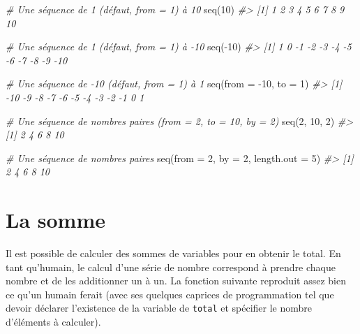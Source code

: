 \documentclass[
]{book}
\newenvironment{Shaded}{}{}
\newcommand{\AttributeTok}[1]{#1}
\newcommand{\CommentTok}[1]{\textit{#1}}
\newcommand{\DecValTok}[1]{#1}
\newcommand{\FunctionTok}[1]{#1}
\newcommand{\NormalTok}[1]{#1}
\newcommand{\SpecialCharTok}[1]{#1}
\begin{document}
\begin{Shaded}
\begin{Highlighting}[]
\CommentTok{\# Une séquence de 1 (défaut, from = 1) à 10}
\FunctionTok{seq}\NormalTok{(}\DecValTok{10}\NormalTok{)}
\CommentTok{\#\textgreater{}  [1]  1  2  3  4  5  6  7  8  9 10}

\CommentTok{\# Une séquence de 1 (défaut, from = 1) à {-}10}
\FunctionTok{seq}\NormalTok{(}\SpecialCharTok{{-}}\DecValTok{10}\NormalTok{)}
\CommentTok{\#\textgreater{}  [1]   1   0  {-}1  {-}2  {-}3  {-}4  {-}5  {-}6  {-}7  {-}8  {-}9 {-}10}

\CommentTok{\# Une séquence de {-}10 (défaut, from = 1) à 1}
\FunctionTok{seq}\NormalTok{(}\AttributeTok{from =} \SpecialCharTok{{-}}\DecValTok{10}\NormalTok{, }\AttributeTok{to =} \DecValTok{1}\NormalTok{)}
\CommentTok{\#\textgreater{}  [1] {-}10  {-}9  {-}8  {-}7  {-}6  {-}5  {-}4  {-}3  {-}2  {-}1   0   1}

\CommentTok{\# Une séquence de nombres paires (from = 2, to = 10, by = 2)}
\FunctionTok{seq}\NormalTok{(}\DecValTok{2}\NormalTok{, }\DecValTok{10}\NormalTok{, }\DecValTok{2}\NormalTok{)}
\CommentTok{\#\textgreater{} [1]  2  4  6  8 10}

\CommentTok{\# Une séquence de nombres paires }
\FunctionTok{seq}\NormalTok{(}\AttributeTok{from =} \DecValTok{2}\NormalTok{, }\AttributeTok{by =} \DecValTok{2}\NormalTok{, }\AttributeTok{length.out =} \DecValTok{5}\NormalTok{)}
\CommentTok{\#\textgreater{} [1]  2  4  6  8 10}
\end{Highlighting}
\end{Shaded}

\hypertarget{la-somme}{%
\section{La somme}\label{la-somme}}

Il est possible de calculer des sommes de variables pour en obtenir le total. En tant qu'humain, le calcul d'une série de nombre correspond à prendre chaque nombre et de les additionner un à un. La fonction suivante reproduit assez bien ce qu'un humain ferait (avec ses quelques caprices de programmation tel que devoir déclarer l'existence de la variable de \texttt{total} et spécifier le nombre d'éléments à calculer).
\end{document}
